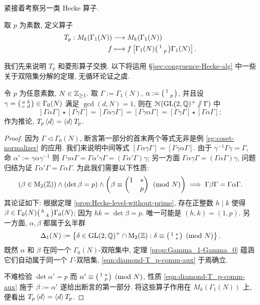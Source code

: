 紧接着考察另一类 Hecke 算子.

\begin{definition}
	取 $p$ 为素数, 定义算子
	\begin{align*}
		T_p: M_k(\Gamma_1(N)) & \longrightarrow M_k(\Gamma_1(N)) \\
		f & \longmapsto f \left[ \Gamma_1(N) \bigl(\begin{smallmatrix} 1 &  \\  & p \end{smallmatrix}\bigr) \Gamma_1(N) \right].
	\end{align*}
\end{definition}

我们先来说明 $T_p$ 和菱形算子交换. 以下将运用 \S\ref{sec:congruence-Hecke-alg} 中一些关于双陪集分解的定理, 无循环论证之虞.
\begin{lemma}\label{prop:diamond-T_p-comm}
	令 $p$ 为任意素数, $N \in \mathbb{Z}_{\geq 1}$. 取 $\Gamma := \Gamma_1(N)$, $\alpha := \bigl(\begin{smallmatrix} 1 &  \\  & p \end{smallmatrix}\bigr)$, 并且设 $\gamma = \bigl(\begin{smallmatrix} a & b \\ c & d \end{smallmatrix}\bigr) \in \Gamma_0(N)$ 满足 $\gcd(d,N)=1$, 则在 $\EuScript{H}(\operatorname{GL}(2,\mathbb{Q})^+ \sslash \Gamma)$ 中
	\[ [\Gamma\alpha\Gamma] \star [\Gamma \gamma \Gamma] = [\Gamma \alpha\gamma \Gamma] = [\Gamma \gamma\alpha \Gamma] = [\Gamma \gamma \Gamma] \star [\Gamma\alpha\Gamma]; \]
	作为推论, $T_p \left\langle d \right\rangle = \left\langle d \right\rangle T_p$.
\end{lemma}
\begin{proof}
	因为 $\Gamma \lhd \Gamma_0(N)$, 断言第一部分的首末两个等式无非是例 \ref{eg:coset-normalizer} 的应用. 我们来说明中间等式 $[\Gamma \alpha\gamma \Gamma] = [\Gamma \gamma\alpha \Gamma]$. 由于 $\gamma^{-1} \Gamma\gamma = \Gamma$, 命 $\alpha' := \gamma\alpha\gamma^{-1}$ 则 $\Gamma \gamma\alpha \Gamma = \Gamma \alpha' \gamma\Gamma = (\Gamma \alpha' \Gamma) \gamma$; 另一方面 $\Gamma \alpha\gamma \Gamma = (\Gamma \alpha \Gamma) \gamma$, 问题归结为证 $\Gamma\alpha'\Gamma = \Gamma\alpha\Gamma$. 为此我们需要以下性质:
	\begin{equation}\label{eqn:diamond-T_p-comm-aux}
		(\beta \in \operatorname{M}_2(\mathbb{Z})) \wedge \left( \det\beta = p \right) \wedge \left( \beta \equiv \begin{pmatrix} 1 & * \\  & p \end{pmatrix} \pmod N \right) \implies \Gamma \beta \Gamma = \Gamma \alpha\Gamma.
	\end{equation}
	其论证如下: 根据定理 \ref{prop:Hecke-level-without-prime}, 存在正整数 $h \mid k$ 使得 $\beta \in \Gamma_0(N) \bigl(\begin{smallmatrix} h &  \\  & k \end{smallmatrix}\bigr) \Gamma_0(N)$; 因为 $hk = \det\beta =p$. 唯一可能是 $(h,k) = (1,p)$. 另一方面, $\alpha, \beta$ 都属于幺半群
	\[ \Delta_1(N) := \left\{ \delta \in \operatorname{GL}(2,\mathbb{Q})^+ \cap \operatorname{M}_2(\mathbb{Z}) : \delta \equiv \bigl(\begin{smallmatrix} 1 & * \\  & * \end{smallmatrix}\bigr) \pmod{N} \right\}. \]
	既然 $\alpha$ 和 $\beta$ 在同一个 $\Gamma_0(N)$-双陪集中, 定理 \ref{prop:Gamma_1-Gamma_0} 蕴涵它们自动属于同一个 $\Gamma$-双陪集, \eqref{eqn:diamond-T_p-comm-aux} 于焉确立.
	
	不难检验 $\det \alpha' = p$ 而 $\alpha' \equiv \bigl(\begin{smallmatrix} 1 & * \\  & p \end{smallmatrix}\bigr) \pmod{N}$, 性质 \eqref{eqn:diamond-T_p-comm-aux} 施于 $\beta := \alpha'$ 遂给出断言的第一部分. 将这些算子作用在 $M_k(\Gamma_1(N))$ 上, 便看出 $T_p \left\langle d \right\rangle = \left\langle d \right\rangle T_p$.
\end{proof}

